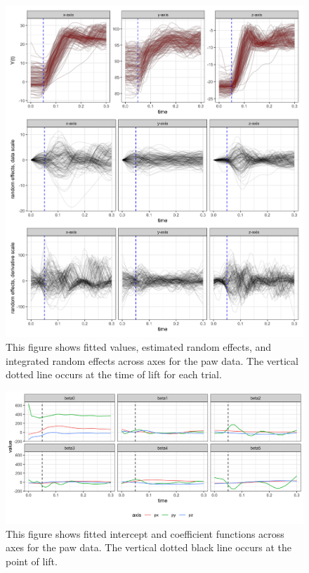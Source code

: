 \documentclass[preprint]{JASA}
\begin{document}
\begin{figure}
\includegraphics[width=\reprintcolumnwidth]{../output/fig_data_fits-1} \caption{This figure shows fitted values, estimated random effects, and integrated random effects across axes for the paw data. The vertical dotted line occurs at the time of lift for each trial.}\label{fig:paw_fits}
\end{figure}

\begin{figure}
\includegraphics[width=\reprintcolumnwidth]{../output/fig_data_beta-1} \caption{This figure shows fitted intercept and coefficient functions across axes for the paw data. The vertical dotted black line occurs at the point of lift.}\label{fig:paw_betas}
\end{figure}
\end{document}
